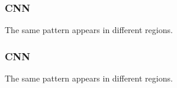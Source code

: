 \documentclass{beamer}
\begin{document}
\begin{frame}
	\frametitle{CNN}
The same pattern appears in different regions.
	
	\begin{figure}
		\hfill
		\hfill
		\hfill
	\end{figure}
	
\end{frame}

\begin{frame}
	\frametitle{CNN}
	The same pattern appears in different regions.
	
	\begin{figure}
		\hfill
		\hfill
		\hfill
	\end{figure}
	
\end{frame}
\end{document}
